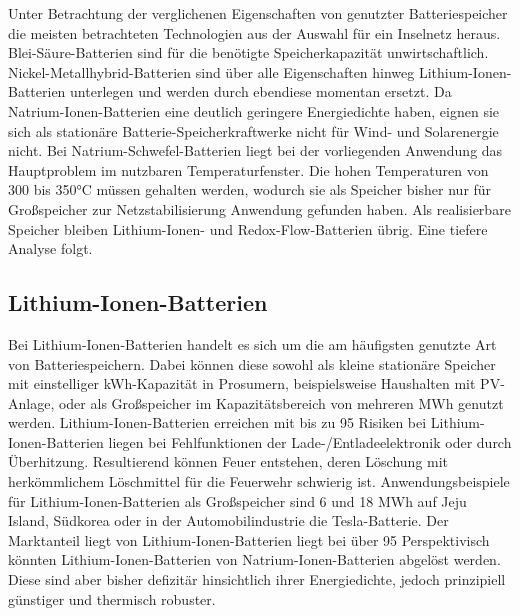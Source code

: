 Unter Betrachtung der verglichenen Eigenschaften von genutzter Batteriespeicher die meisten betrachteten Technologien aus der Auswahl für ein Inselnetz heraus. Blei-Säure-Batterien sind für die benötigte Speicherkapazität unwirtschaftlich. Nickel-Metallhybrid-Batterien sind über alle Eigenschaften hinweg Lithium-Ionen-Batterien unterlegen und werden durch ebendiese momentan ersetzt. Da Natrium-Ionen-Batterien eine deutlich geringere Energiedichte haben, eignen sie sich als stationäre Batterie-Speicherkraftwerke nicht für Wind- und Solarenergie nicht. Bei Natrium-Schwefel-Batterien liegt bei der vorliegenden Anwendung das Hauptproblem im nutzbaren Temperaturfenster. Die hohen Temperaturen von 300 bis 350°C müssen gehalten werden, wodurch sie als Speicher bisher nur für Großspeicher zur Netzstabilisierung Anwendung gefunden haben. Als realisierbare Speicher bleiben Lithium-Ionen- und Redox-Flow-Batterien übrig. Eine tiefere Analyse folgt.

\subsection{Lithium-Ionen-Batterien}

Bei Lithium-Ionen-Batterien handelt es sich um die am häufigsten genutzte Art von Batteriespeichern. Dabei können diese sowohl als kleine stationäre Speicher mit einstelliger kWh-Kapazität in Prosumern, beispielsweise Haushalten mit PV-Anlage, oder als Großspeicher im Kapazitätsbereich von mehreren MWh genutzt werden.
Lithium-Ionen-Batterien erreichen mit bis zu 95 %
Risiken bei Lithium-Ionen-Batterien liegen bei Fehlfunktionen der Lade-/Entladeelektronik oder durch Überhitzung. Resultierend können Feuer entstehen, deren Löschung mit herkömmlichem Löschmittel für die Feuerwehr schwierig ist.
Anwendungsbeispiele für Lithium-Ionen-Batterien als Großspeicher sind 6 und 18 MWh auf Jeju Island, Südkorea oder in der Automobilindustrie die Tesla-Batterie. Der Marktanteil liegt von Lithium-Ionen-Batterien liegt bei über 95%
Perspektivisch könnten Lithium-Ionen-Batterien von Natrium-Ionen-Batterien abgelöst werden. Diese sind aber bisher defizitär hinsichtlich ihrer Energiedichte, jedoch prinzipiell günstiger und thermisch robuster. 

